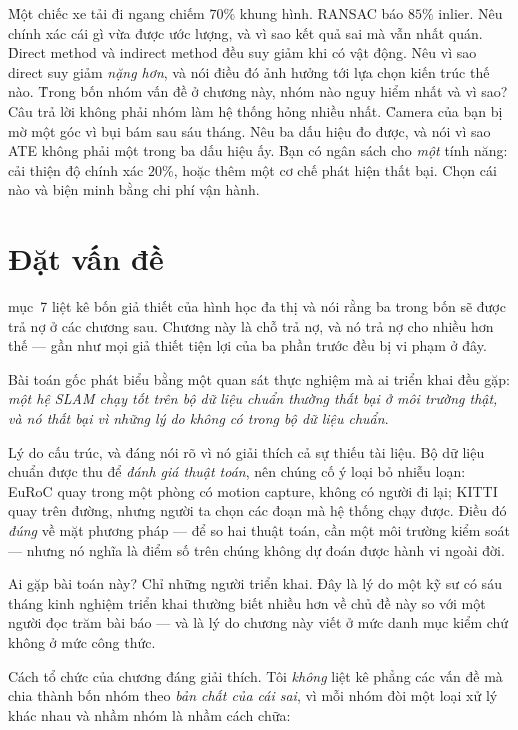\documentclass[../../vslam.tex]{subfiles}
\begin{document}
\begin{khoigoi}
\h{Một chiếc xe tải đi ngang chiếm \(70\%\) khung hình. RANSAC báo \(85\%\) inlier. Nêu chính xác cái gì vừa được ước lượng, và vì sao kết quả sai mà vẫn nhất quán.}
\h{Direct method và indirect method đều suy giảm khi có vật động. Nêu vì sao direct suy giảm \emph{nặng hơn}, và nói điều đó ảnh hưởng tới lựa chọn kiến trúc thế nào.}
\h{Trong bốn nhóm vấn đề ở chương này, nhóm nào nguy hiểm nhất và vì sao? Câu trả lời không phải nhóm làm hệ thống hỏng nhiều nhất.}
\h{Camera của bạn bị mờ một góc vì bụi bám sau sáu tháng. Nêu ba dấu hiệu đo được, và nói vì sao ATE không phải một trong ba dấu hiệu ấy.}
\h{Bạn có ngân sách cho \emph{một} tính năng: cải thiện độ chính xác \(20\%\), hoặc thêm một cơ chế phát hiện thất bại. Chọn cái nào và biện minh bằng chi phí vận hành.}
\end{khoigoi}

\section{Đặt vấn đề}

 mục~7 liệt kê bốn giả thiết của hình học đa thị và nói rằng ba trong bốn sẽ được trả nợ ở các chương sau. Chương này là chỗ trả nợ, và nó trả nợ cho nhiều hơn thế --- gần như mọi giả thiết tiện lợi của ba phần trước đều bị vi phạm ở đây.

Bài toán gốc phát biểu bằng một quan sát thực nghiệm mà ai triển khai đều gặp: \emph{một hệ SLAM chạy tốt trên bộ dữ liệu chuẩn thường thất bại ở môi trường thật, và nó thất bại vì những lý do không có trong bộ dữ liệu chuẩn}.

Lý do cấu trúc, và đáng nói rõ vì nó giải thích cả sự thiếu tài liệu. Bộ dữ liệu chuẩn được thu để \emph{đánh giá thuật toán}, nên chúng cố ý loại bỏ nhiễu loạn: EuRoC quay trong một phòng có motion capture, không có người đi lại; KITTI quay trên đường, nhưng người ta chọn các đoạn mà hệ thống chạy được. Điều đó \emph{đúng} về mặt phương pháp --- để so hai thuật toán, cần một môi trường kiểm soát --- nhưng nó nghĩa là điểm số trên chúng không dự đoán được hành vi ngoài đời.

Ai gặp bài toán này? Chỉ những người triển khai. Đây là lý do một kỹ sư có sáu tháng kinh nghiệm triển khai thường biết nhiều hơn về chủ đề này so với một người đọc trăm bài báo --- và là lý do chương này viết ở mức danh mục kiểm chứ không ở mức công thức.

Cách tổ chức của chương đáng giải thích. Tôi \emph{không} liệt kê phẳng các vấn đề mà chia thành bốn nhóm theo \emph{bản chất của cái sai}, vì mỗi nhóm đòi một loại xử lý khác nhau và nhầm nhóm là nhầm cách chữa:
\end{document}
